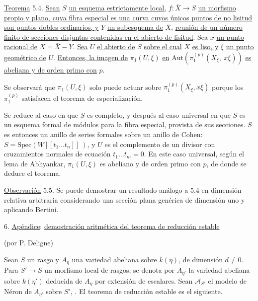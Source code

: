 
\underline{Teorema} 5.4. \underline{Sean} $S$ \underline{un esquema estrictamente local,} $f : \bar{X} \longrightarrow S$ \underline{un morfismo propio y plano, cuya fibra especial es una curva cuyos únicos puntos de no lisitud son puntos dobles ordinarios, y} $Y$ \underline{un subesquema de} $\bar{X}$, \underline{reunión de un número finito de secciones disjuntas contenidas en el abierto de lisitud}. Sea $x$ \underline{un punto racional de} $X = \bar{X} - Y$. \underline{Sea} $U$ \underline{el abierto de} $S$ \underline{sobre el cual} $X$ \underline{es liso, y} $\xi$ \underline{un punto geométrico de} $U$. \underline{Entonces, la imagen de} $\pi_1(U,\xi)$ \underline{en} $\mathrm{Aut}(\pi_1^{(p)}(X_\xi,\ x\xi))$ \underline{es abeliana y de orden primo con} $p$.

Se observará que $\pi_1(U,\xi)$ solo puede actuar sobre $\pi_1^{(p)}(X_\xi,x\xi)$ porque los $\pi_1^{(p)}$ satisfacen el teorema de especialización.

Se reduce al caso en que $S$ es completo, y después al caso universal en que $S$ es un esquema formal de módulos para la fibra especial, provista de sus secciones. $S$ es entonces un anillo de series formales sobre un anillo de Cohen: $S = \mathrm{Spec}(W[[t_1 \ldots t_n]]\ )$, y $U$ es el complemento de un divisor con cruzamientos normales de ecuación $t_1 \ldots t_m = 0$. En este caso universal, según el lema de Abhyankar, $\pi_1(U,\xi)$ es abeliano y de orden primo con $p$, de donde se deduce el teorema.

\underline{Observación} 5.5. Se puede demostrar un resultado análogo a 5.4 en dimensión relativa arbitraria considerando una sección plana genérica de dimensión uno y aplicando Bertini.


6. \underline{Apéndice}: \underline{demostración aritmética del teorema de reducción estable}

(por P. Deligne)

Sean $S$ un rasgo y $A_\eta$ una variedad abeliana sobre $k(\eta)$, de dimensión $d \neq 0$. Para $S' \longrightarrow S$ un morfismo local de rasgos, se denota por $A_{\eta'}$ la variedad abeliana sobre $k(\eta')$ deducida de $A_\eta$ por extensión de escalares. Sean $\mathcal{A}_{S'}$ el modelo de Néron de $A_{\eta'}$ sobre $S'$, . El teorema de reducción estable es el siguiente.

